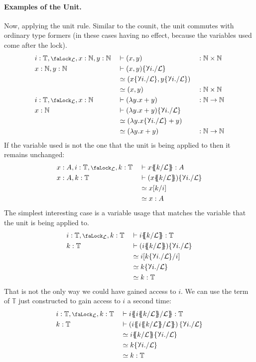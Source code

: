 \documentclass[10pt]{article}
\theoremstyle{definition}
\let\oldequiv\equiv%
\renewcommand{\equiv}{\simeq}
\newcommand{\defeq}{\oldequiv}
\newcommand{\yields}{\vdash}
\newcommand*{\NN}{\mathbb{N}}
\newcommand{\lock}{\mathchoice {\scalebox{0.8}{\text{\faLock}}}
  {\scalebox{0.8}{\text{\faLock}}} {\scalebox{0.5}{\text{\faLock}}}
  {\scalebox{0.4}{\text{\faLock}}} }
\newcommand{\rbindsym}{%
  \mathchoice
    {\reflectbox{\rotatebox[origin=c]{185}{$\lambda$}}}  %
    {\reflectbox{\rotatebox[origin=c]{185}{$\lambda$}}}  %
    {\reflectbox{\rotatebox[origin=c]{185}{$\scriptstyle\lambda$}}}  %
    {\reflectbox{\rotatebox[origin=c]{185}{$\scriptscriptstyle\lambda$}}}  %
  }
\newcommand{\Tiny}{\mathbb{T}}
\newcommand{\lockn}[1]{\mathcal{#1}}
\newcommand{\ctxlocke}[1]{\lock_{#1}}
\newcommand{\ctxlock}[1]{\ctxlocke{\lockn{#1}}}
\newcommand{\stubra}[1]{\{\!\!\{ #1 \}\!\!\}}
\newcommand{\admbra}[1]{\{\mkern-1mu #1 \mkern-0.5mu\}}
\newcommand{\substuck}[2]{\stubra{#1/\lockn{#2}}}
\newcommand{\sublock}[2]{\admbra{\rbindsym{} #1. /\lockn{#2} }}
\begin{document}
\paragraph{Examples of the Unit.}
Now, applying the unit rule. Similar to the counit, the unit commutes
with ordinary type formers (in these cases having no effect, because
the variables used come after the lock).
\begin{alignat*}{3}
  &i : \Tiny, \ctxlock{L},x : \NN,  y : \NN
  &&\yields (x, y) &&: \NN \times \NN \\
  &x : \NN,  y : \NN
  &&\yields (x, y)\sublock{i}{L} \\
  &&&\defeq (x\sublock{i}{L}, y\sublock{i}{L})\\
  &&&\defeq (x, y) &&: \NN \times \NN  \\
  &i : \Tiny, \ctxlock{L}, x : \NN
  &&\yields (\lambda y. x + y) &&: \NN \to \NN  \\
  &x : \NN
  &&\yields (\lambda y. x + y)\sublock{i}{L} \\
  &&&\defeq (\lambda y. x\sublock{i}{L} + y) \\
  &&&\defeq (\lambda y. x + y) &&: \NN \to \NN
\end{alignat*}
If the variable used is not the one that the unit is being applied to
then it remains unchanged:
\begin{alignat*}{2}
  &x : A, i : \Tiny,\ctxlock{L}, k : \Tiny
  &&\yields x\substuck{k}{L} : A \\
  &x : A, k : \Tiny
  &&\yields (x\substuck{k}{L})\sublock{i}{L} \\
  &&&\defeq x[k/i] \\
  &&&\defeq x : A
\end{alignat*}
The simplest interesting case is a variable usage that matches the
variable that the unit is being applied to.
\begin{alignat*}{2}
  &i : \Tiny,\ctxlock{L}, k : \Tiny
  &&\yields i\substuck{k}{L} : \Tiny \\
  &k : \Tiny
  &&\yields (i\substuck{k}{L})\sublock{i}{L} \\
  &&&\defeq i[k\sublock{i}{L}/i] \\
  &&&\defeq k\sublock{i}{L} \\
  &&&\defeq k : \Tiny 
\end{alignat*}
That is not the only way we could have gained access to $i$. We can
use the term of $\Tiny$ just constructed to gain access to $i$ a
second time:
\begin{alignat*}{2}
  &i : \Tiny, \ctxlock{L}, k : \Tiny
  &&\yields i\substuck{i\substuck{k}{L}}{L} : \Tiny \\
  &k : \Tiny
  &&\yields \left( i\substuck{i\substuck{k}{L}}{L} \right)\sublock{i}{L} \\
  &&&\defeq i\substuck{k}{L}\sublock{i}{L} \\
  &&&\defeq k\sublock{i}{L} \\
  &&&\defeq k : \Tiny
\end{alignat*}
\end{document}
